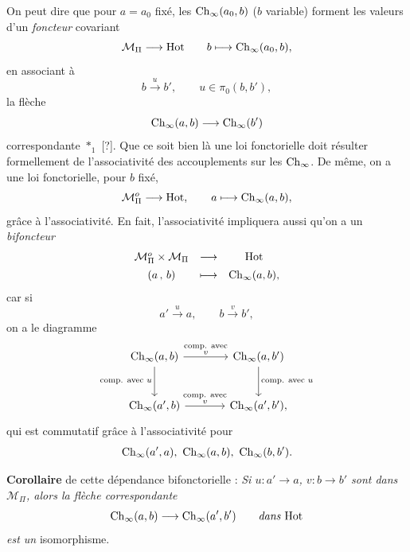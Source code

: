 On peut dire que pour $a = a_0$ fixé, les $\mathrm{Ch}_\infty(a_0,b)$ ($b$ variable) forment les valeurs d'un \textit{foncteur} covariant
\[
\mathcal{M}_\Pi \longrightarrow \mathrm{Hot} \qquad b \longmapsto \mathrm{Ch}_\infty(a_0,b),
\]
en associant à
\[
b \xrightarrow{\ u\ } b', \qquad u \in \pi_0(b,b'),
\]
la flèche
\[
\Ch_\infty(a,b) \longrightarrow \Ch_\infty(b') %
\]
 correspondante $*_1$ [?]. Que ce soit bien là une loi fonctorielle doit résulter formellement de l'associativité des accouplements sur les $\mathrm{Ch}_\infty$. De même, on a une loi fonctorielle, pour $b$ fixé,
\[
\mathcal{M}^o_\Pi \longrightarrow \mathrm{Hot}, \qquad a \longmapsto \mathrm{Ch}_\infty(a,b),
\]
grâce à l'associativité. En fait, l'associativité impliquera aussi qu'on a un \textit{bifoncteur}
\[
\begin{array}{ccc}
\mathcal{M}^o_\Pi \times \mathcal{M}_\Pi & \longrightarrow & \mathrm{Hot} \\[1ex]
(a\,,\,b) & \longmapsto & \mathrm{Ch}_\infty(a,b),
\end{array}
\]
car si
\[
a' \xrightarrow{\ u\ } a, \qquad b \xrightarrow{\ v\ } b',
\]
on a le diagramme
\[
\begin{tikzcd}[column sep=large, row sep=large]
\Ch_\infty(a,b) \arrow[r, "\substack{\text{comp. avec}\\ v}"] \arrow[d, "\text{comp. avec } u"'] & \Ch_\infty(a,b') \arrow[d, "\text{comp. avec } u"] \\
\Ch_\infty(a',b) \arrow[r, "\substack{\text{comp. avec}\\ v}"] & \Ch_\infty(a',b'),
\end{tikzcd}
\]
qui est commutatif grâce à l'associativité pour
\[
\mathrm{Ch}_\infty(a',a),\ \mathrm{Ch}_\infty(a,b),\ \mathrm{Ch}_\infty(b,b').
\]

\textbf{Corollaire} de cette dépendance bifonctorielle : \textit{Si $u : a' \longrightarrow a$, $v : b \longrightarrow b'$ sont dans $\mathcal{M}_\Pi$, alors la flèche correspondante}
\[
\mathrm{Ch}_\infty(a,b) \longrightarrow \mathrm{Ch}_\infty(a',b') \qquad \textit{dans } \mathrm{Hot}
\]
\textit{est un} isomorphisme.

